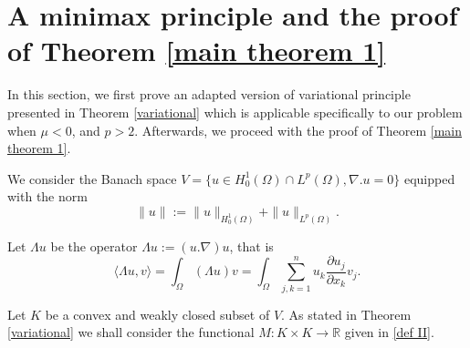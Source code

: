 \documentclass[reqno]{amsart}
\begin{document}
\section{A minimax principle and the proof of Theorem \ref{main theorem 1}}

In this section, we first prove an adapted version of  variational principle
presented in Theorem \ref{variational} which is  applicable specifically to our
problem when \(\mu<0\), and $p>2$. Afterwards, we proceed with the proof of
Theorem \ref{main theorem 1}.

 We  consider the Banach space
\(
V= \{ u\in H_0^1(\Omega)\cap L^p(\Omega),\nabla . u=0\}
\)
equipped with the  norm
\[
\rVert u \rVert:= \rVert u \rVert_{ H_0^{1}(\Omega)}
+\rVert u \rVert_{ L^{p}(\Omega)}.
\]

Let \(\Lambda u\) be the operator \(\Lambda u := (u . \nabla)u\), that is
\[
\langle \Lambda u, v\rangle
= \int_\Omega (\Lambda u)v =\int_\Omega\sum_{j,k=1}^n
u_k\frac{\partial u_j}{\partial x_k}v_j.
\]

Let \( K\) be a convex and weakly closed subset of \(V\).
As stated in Theorem \ref{variational} we shall consider the functional
\( M : K \times K \to\mathbb{R}\) given in  \eqref{def II}.
\end{document}

